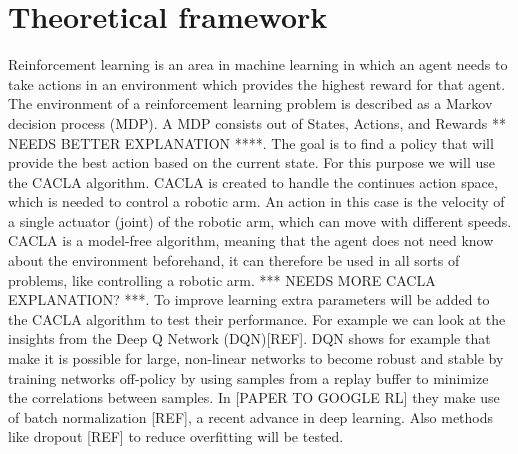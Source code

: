 \section{Theoretical framework}
Reinforcement learning is an area in machine learning in which an agent needs to take actions in an environment which provides the highest reward for that agent. The environment of a reinforcement learning problem
is described as a Markov decision process (MDP). A MDP consists out of States, Actions, and Rewards ** NEEDS BETTER EXPLANATION ****. The goal is to find a policy that will provide the best action based on the current state. 
For this purpose we will use the CACLA algorithm. CACLA is created to handle the continues action space, which is needed to control a robotic arm. An action in this case is the velocity of a single actuator (joint) of the 
robotic arm, which can move with different speeds. CACLA is a model-free algorithm, meaning that the agent does not need know about the environment beforehand, it can therefore be used in all sorts of problems, like controlling a 
robotic arm. *** NEEDS MORE CACLA EXPLANATION? ***. 
To improve learning extra parameters will be added to the CACLA algorithm to test their performance. For example we can look at the insights from the Deep Q Network (DQN)[REF]. DQN shows for example that make it is possible for 
large, non-linear networks to become robust and stable by training networks off-policy by using samples from a replay buffer to minimize the correlations between samples. In [PAPER TO GOOGLE RL] they make use of 
batch normalization [REF], a recent advance in deep learning. Also methods like dropout [REF] to reduce overfitting will be tested. 

 
